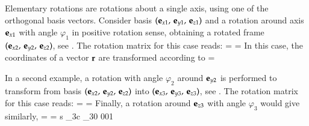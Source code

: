 {
Elementary rotations are rotations about a single axis, using one of the orthogonal basis vectors.
Consider basis $(\mathbf{e}_{x1},\,\mathbf{e}_{y1},\,\mathbf{e}_{z1})$ and a rotation around axis $\mathbf{e}_{x1}$ with angle $\varphi_1$ in positive rotation sense, obtaining a rotated frame $(\mathbf{e}_{x2},\,\mathbf{e}_{y2},\,\mathbf{e}_{z2})$, see .
The rotation matrix for this case reads:
\be
   =  = 
  \eqDot
\ee
%  
In this case, the coordinates of a vector $\mathbf{r}$ are transformed according to
\be
   =  
\ee

%
In a second example, a rotation with angle $\varphi_2$ around $\mathbf{e}_{y2}$ is performed to transform from basis $(\mathbf{e}_{x2},\,\mathbf{e}_{y2},\,\mathbf{e}_{z2})$ into $(\mathbf{e}_{x3},\,\mathbf{e}_{y3},\,\mathbf{e}_{z3})$, see .
The rotation matrix for this case reads:
\be
   =  = 
  \eqDot
\ee
%
%
Finally, a rotation around $\mathbf{e}_{z3}$ with angle $\varphi_3$ would give similarly,
\be
   =  = 
   {s \varphi_3}{c \varphi_3}{0} {0}{0}{1} \eqDot
\ee



}
